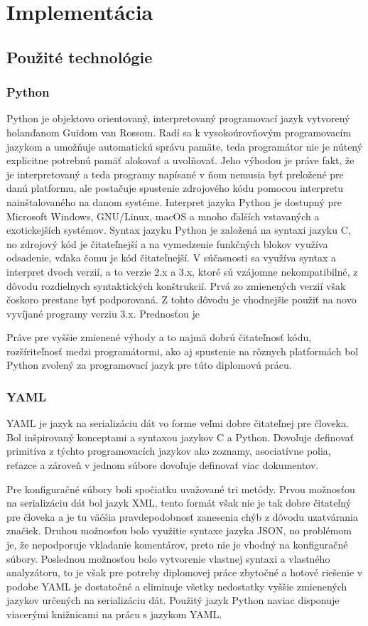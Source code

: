 \chapter{Implementácia}

\section{Použité technológie}
 \subsection{Python}
 Python \cite{B4mfUgNUpPnXbiEr} je objektovo orientovaný, interpretovaný programovací jazyk vytvorený holanďanom Guidom van Rossom. Radí sa k vysokoúrovňovým programovacím jazykom a umožňuje automatickú správu pamäte, teda programátor nie je nútený explicitne potrebnú pamäť alokovať a uvolňovať. Jeho výhodou je práve fakt, že je interpretovaný a teda programy napísané v ňom nemusia byť preložené pre danú platformu, ale postačuje spustenie zdrojového kódu pomocou interpretu nainštalovaného na danom systéme. Interpret jazyka Python je dostupný pre Microsoft Windows, GNU/Linux, macOS a mnoho ďalších vstavaných a exotickejších systémov. Syntax jazyku Python je založená na syntaxi jazyku C, no zdrojový kód je čitateľnejší a na vymedzenie funkčných blokov využíva odsadenie, vďaka čomu je kód čitateľnejší. V súčasnosti sa využíva syntax a interpret dvoch verzií, a to verzie 2.x a 3.x, ktoré sú vzájomne nekompatibilné, z dôvodu rozdielnych syntaktických konštrukcií. Prvá zo zmienených verzií však čoskoro prestane byť podporovaná. Z tohto dôvodu je vhodnejšie použiť na novo vyvíjané programy verziu 3.x. Prednosťou je 
  
 Práve pre vyššie zmienené výhody a to najmä dobrú čitateľnosť kódu, rozšíriteľnosť  medzi programátormi, ako aj spustenie na rôznych platformách bol Python zvolený za programovací jazyk pre túto diplomovú prácu.
 \subsection{YAML}
 YAML \cite{Jd4UTaVyTULvXDoN} je jazyk na serializáciu dát vo forme veľmi dobre čitateľnej pre človeka. Bol inšpirovaný konceptami a syntaxou jazykov C a Python. Dovoľuje definovať primitíva z týchto programovacích jazykov ako zoznamy, asociatívne polia, reťazce a zároveň v jednom súbore dovoľuje definovať viac dokumentov.
 
 Pre konfiguračné súbory boli spočiatku uvažované tri metódy. Prvou možnosťou na serializáciu dát bol jazyk XML, tento formát však nie je tak dobre čitateľný pre človeka a je tu väčšia pravdepodobnosť zanesenia chýb z dôvodu uzatvárania značiek. Druhou možnosťou bolo využitie syntaxe jazyka JSON, no problémom je, že nepodporuje vkladanie komentárov, preto nie je vhodný na konfiguračné súbory. Poslednou možnosťou bolo vytvorenie vlastnej syntaxi a vlastného analyzátoru, to je však pre potreby diplomovej práce zbytočné a hotové riešenie v podobe YAML je dostatočné a eliminuje všetky nedostatky vyššie zmienených jazykov určených na serializáciu dát. Použitý jazyk Python naviac disponuje viacerými knižnicami na prácu s jazykom YAML.  
 \newpage
